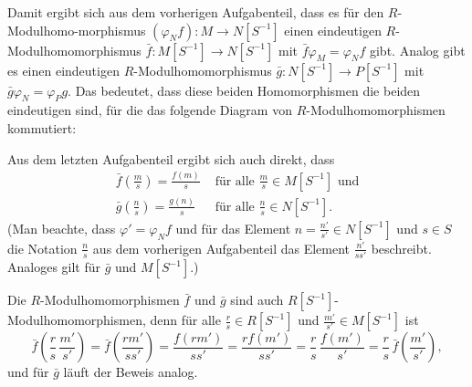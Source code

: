 \documentclass[a4paper,10pt]{article}
\theoremstyle{definition}
\begin{document}
Damit ergibt sich aus dem vorherigen Aufgabenteil, dass es für den $R$-Modulhomo-morphismus $(\varphi_N f) : M \rightarrow N[S^{-1}]$ einen eindeutigen $R$-Modulhomomorphismus $\bar{f} : M[S^{-1}] \rightarrow N[S^{-1}]$ mit $\bar{f} \varphi_M = \varphi_N f$ gibt. Analog gibt es einen eindeutigen $R$-Modulhomomorphismus $\bar{g} : N[S^{-1}] \rightarrow P[S^{-1}]$ mit $\bar{g} \varphi_N = \varphi_P g$. Das bedeutet, dass diese beiden Homomorphismen die beiden eindeutigen sind, für die das folgende Diagram von $R$-Modulhomomorphismen kommutiert:
\begin{center}
\end{center}

Aus dem letzten Aufgabenteil ergibt sich auch direkt, dass
\begin{align*}
 \bar{f}\left(\frac{m}{s}\right) = \frac{f(m)}{s} &\text{ für alle } \frac{m}{s} \in M[S^{-1}] \text{ und} \\
 \bar{g}\left(\frac{n}{s}\right) = \frac{g(n)}{s} &\text{ für alle } \frac{n}{s} \in N[S^{-1}].
\end{align*}
(Man beachte, dass $\varphi' = \varphi_N f$ und für das Element $n = \frac{n'}{s'} \in N[S^{-1}]$ und $s \in S$ die Notation $\frac{n}{s}$ aus dem vorherigen Aufgabenteil das Element $\frac{n'}{ss'}$ beschreibt. Analoges gilt für $\bar{g}$ und $M[S^{-1}]$.)

Die $R$-Modulhomomorphismen $\bar{f}$ und $\bar{g}$ sind auch $R[S^{-1}]$-Modulhomomorphismen, denn für alle $\frac{r}{s} \in R[S^{-1}]$ und $\frac{m'}{s'} \in M[S^{-1}]$ ist
\[
 \bar{f}\left( \frac{r}{s} \, \frac{m'}{s'} \right)
 = \bar{f}\left( \frac{rm'}{ss'} \right)
 = \frac{f(rm')}{ss'}
 = \frac{r f(m')}{ss'}
 = \frac{r}{s} \, \frac{f(m')}{s'}
 = \frac{r}{s} \, \bar{f}\left( \frac{m'}{s'} \right),
\]
und für $\bar{g}$ läuft der Beweis analog.
\end{document}

